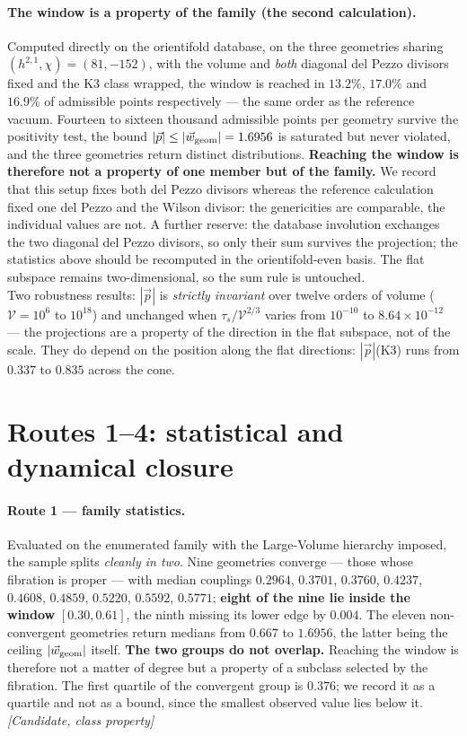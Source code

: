 \paragraph{The window is a property of the family (the second calculation).} Computed directly on the orientifold database, on the three geometries sharing $(h^{2,1},\chi)=(81,-152)$, with the volume and \emph{both} diagonal del Pezzo divisors fixed and the K3 class wrapped, the window is reached in $13.2\%$, $17.0\%$ and $16.9\%$ of admissible points respectively --- the same order as the reference vacuum. Fourteen to sixteen thousand admissible points per geometry survive the positivity test, the bound $|\vec p|\leq|\vec w_{\rm geom}|=1.6956$ is saturated but never violated, and the three geometries return distinct distributions. \textbf{Reaching the window is therefore not a property of one member but of the family.} We record that this setup fixes both del Pezzo divisors whereas the reference calculation fixed one del Pezzo and the Wilson divisor: the genericities are comparable, the individual values are not. A further reserve: the database involution exchanges the two diagonal del Pezzo divisors, so only their sum survives the projection; the statistics above should be recomputed in the orientifold-even basis. The flat subspace remains two-dimensional, so the sum rule is untouched.\\[2pt]
Two robustness results: $|\vec p|$ is \emph{strictly invariant} over twelve orders of volume ($\mathcal V=10^6$ to $10^{18}$) and unchanged when $\tau_s/\mathcal V^{2/3}$ varies from $10^{-10}$ to $8.64\times10^{-12}$ --- the projections are a property of the direction in the flat subspace, not of the scale. They do depend on the position along the flat directions: $|\vec p|$(K3) runs from $0.337$ to $0.835$ across the cone.

\section{Routes 1--4: statistical and dynamical closure}
\paragraph{Route 1 --- family statistics.} Evaluated on the enumerated family with the Large-Volume hierarchy imposed, the sample splits \emph{cleanly in two}. Nine geometries converge --- those whose fibration is proper --- with median couplings $0.2964$, $0.3701$, $0.3760$, $0.4237$, $0.4608$, $0.4859$, $0.5220$, $0.5592$, $0.5771$; \textbf{eight of the nine lie inside the window} $[0.30,0.61]$, the ninth missing its lower edge by $0.004$. The eleven non-convergent geometries return medians from $0.667$ to $1.6956$, the latter being the ceiling $|\vec w_{\rm geom}|$ itself. \textbf{The two groups do not overlap.} Reaching the window is therefore not a matter of degree but a property of a subclass selected by the fibration. The first quartile of the convergent group is $0.376$; we record it as a quartile and not as a bound, since the smallest observed value lies below it. \textit{[Candidate, class property]}
